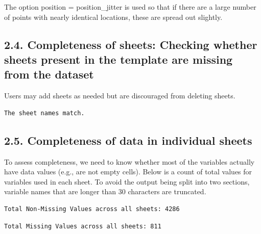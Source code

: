\documentclass[
]{article}
\begin{document}
The option position = position\_jitter is used so that if there are a
large number of points with nearly identical locations, these are spread
out slightly.

\newpage

\subsection{2.4. Completeness of sheets: Checking whether sheets present
in the template are missing from the
dataset}\label{completeness-of-sheets-checking-whether-sheets-present-in-the-template-are-missing-from-the-dataset}

Users may add sheets as needed but are discouraged from deleting sheets.

\begin{verbatim}
The sheet names match.
\end{verbatim}

\subsection{2.5. Completeness of data in individual
sheets}\label{completeness-of-data-in-individual-sheets}

To assess completeness, we need to know whether most of the variables
actually have data values (e.g., are not empty cells). Below is a count
of total values for variables used in each sheet. To avoid the output
being split into two sections, variable names that are longer than 30
characters are truncated.

\begin{verbatim}
Total Non-Missing Values across all sheets: 4286 
\end{verbatim}

\begin{verbatim}
Total Missing Values across all sheets: 811 
\end{verbatim}
\end{document}
